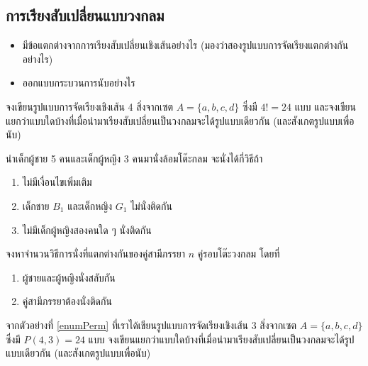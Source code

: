 \subsection{การเรียงสับเปลี่ยนแบบวงกลม}
\begin{itemize}
	\item มีข้อแตกต่างจากการเรียงสับเปลี่ยนเชิงเส้นอย่างไร (มองว่าสองรูปแบบการจัดเรียงแตกต่างกันอย่างไร)
	\item ออกแบบกระบวนการนับอย่างไร
\end{itemize}
\vspace{3 cm}
\begin{exam}
	จงเขียนรูปแบบการจัดเรียงเชิงเส้น 4 สิ่งจากเซต $ A = \{a,b,c,d\} $ ซึ่งมี $ 4!=24 $ แบบ และจงเขียนแยกว่าแบบใดบ้างที่เมื่อนำมาเรียงสับเปลี่ยนเป็นวงกลมจะได้รูปแบบเดียวกัน (และสังเกตรูปแบบเพื่อนับ)
\end{exam}

\begin{exam}
	นำเด็กผู้ชาย 5 คนและเด็กผู้หญิง 3 คนมานั่งล้อมโต๊ะกลม จะนั่งได้กี่วิธีถ้า
	\begin{enumerate}
		\item ไม่มีเงื่อนไขเพิ่มเติม
		\item เด็กชาย $ B_1 $ และเด็กหญิง $ G_1 $ ไม่นั่งติดกัน
		\item ไม่มีเด็กผู้หญิงสองคนใด ๆ นั่งติดกัน
	\end{enumerate}
\end{exam}

\begin{exam}
	จงหาจำนวนวิธีการนั่งที่แตกต่างกันของคู่สามีภรรยา $ n $ คู่รอบโต๊ะวงกลม โดยที่
	\begin{enumerate}
		\item ผู้ชายและผู้หญิงนั่งสลับกัน
		\item คู่สามีภรรยาต้องนั่งติดกัน
	\end{enumerate}
\end{exam}

\begin{exam}
	จากตัวอย่างที่ \ref{enumPerm} ที่เราได้เขียนรูปแบบการจัดเรียงเชิงเส้น 3 สิ่งจากเซต $ A = \{a,b,c,d\} $ ซึ่งมี $ P(4,3)=24 $ แบบ จงเขียนแยกว่าแบบใดบ้างที่เมื่อนำมาเรียงสับเปลี่ยนเป็นวงกลมจะได้รูปแบบเดียวกัน (และสังเกตรูปแบบเพื่อนับ)
\end{exam}

